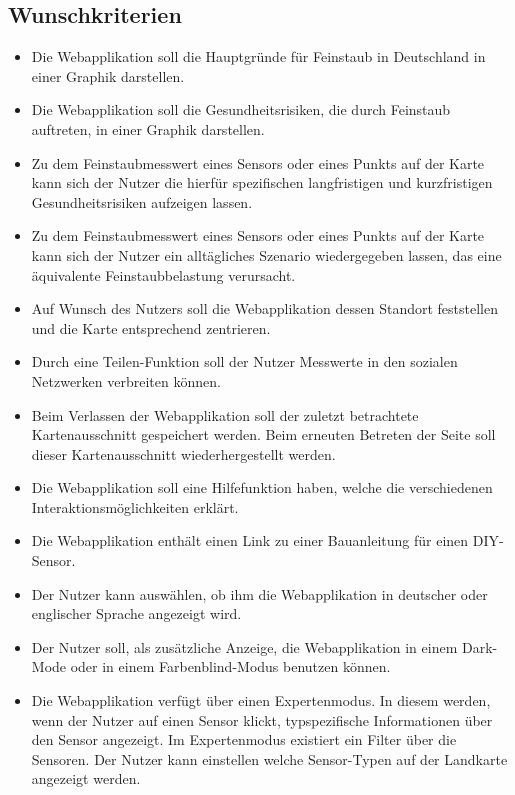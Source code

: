 \subsection{Wunschkriterien}
   \begin{itemize}
   	\item Die Webapplikation soll die Hauptgründe für \gls{Feinstaub} in Deutschland in einer Graphik darstellen.
   	\item Die Webapplikation soll die Gesundheitsrisiken, die durch \gls{Feinstaub} auftreten, in einer Graphik darstellen. 
	\item Zu dem \gls{Feinstaub}messwert eines Sensors oder eines Punkts auf der Karte kann sich der Nutzer die hierfür spezifischen langfristigen und kurzfristigen Gesundheitsrisiken aufzeigen lassen.
	\item Zu dem \gls{Feinstaub}messwert eines Sensors oder eines Punkts auf der Karte kann sich der Nutzer ein alltägliches Szenario wiedergegeben lassen, das eine äquivalente \gls{Feinstaub}belastung verursacht.
	\item Auf Wunsch des Nutzers soll die Webapplikation dessen Standort feststellen und die Karte entsprechend zentrieren.
	\item Durch eine Teilen-Funktion soll der Nutzer Messwerte in den sozialen Netzwerken verbreiten können.
	\item Beim Verlassen der Webapplikation soll der zuletzt betrachtete Kartenausschnitt gespeichert werden. Beim erneuten Betreten der Seite soll dieser Kartenausschnitt wiederhergestellt werden.
	\item Die Webapplikation soll eine Hilfefunktion haben, welche die verschiedenen Interaktionsmöglichkeiten erklärt.
	\item Die Webapplikation enthält einen Link zu einer Bauanleitung für einen \gls{DIY}-\gls{Sensor}.
	\item Der Nutzer kann auswählen, ob ihm die Webapplikation in deutscher oder englischer Sprache angezeigt wird.
	\item Der Nutzer soll, als zusätzliche Anzeige, die Webapplikation in einem Dark-Mode oder in einem Farbenblind-Modus benutzen können.
	\item Die Webapplikation verfügt über einen Expertenmodus. In diesem werden, wenn der Nutzer auf einen Sensor klickt, typspezifische Informationen über den \gls{Sensor} angezeigt.
	Im Expertenmodus existiert ein Filter über die Sensoren. Der Nutzer kann einstellen welche \gls{Sensor}-Typen auf der Landkarte angezeigt werden.        
\end{itemize}
